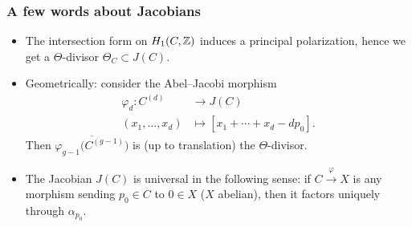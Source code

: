 \begin{frame}
\frametitle{A few words about Jacobians}

\begin{itemize}
	\item The intersection form on $H_1(C,\mathbb{Z})$ induces a principal polarization, hence we get a \alert{$\Theta$-divisor} $\Theta_C \subset J(C)$.
	\pause
	\item Geometrically: consider the \alert{Abel--Jacobi} morphism
	\begin{align*}
	\varphi_d\colon C^{(d)} &\to J(C) \\
	(x_1,\ldots,x_d) &\mapsto [x_1+\cdots+ x_d-dp_0].
	\end{align*}
	Then $\overline{\varphi_{g-1}\big(C^{(g-1)}\big)}$ is (up to translation) the $\Theta$-divisor. \pause
	\item The Jacobian $J(C)$ is \alert{universal} in the following sense: if $C \xrightarrow{\varphi} X$ is any morphism sending $p_0 \in C$ to $0 \in X$ ($X$ abelian), then it factors uniquely through $\alpha_{p_0}$.
\end{itemize}
\end{frame}